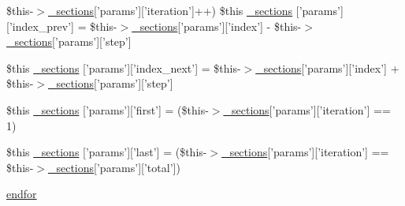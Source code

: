\begin{DoxyCompactItemize}
\$this-\/$>$\hyperlink{_06_06127_05_06_0612781687_05pkgelementindex_8tpl_8php_a9e3d26b39edfe29c3f29b8035ef33828}{\-\_\-sections}\mbox{[}'params'\mbox{]}\mbox{[}'iteration'\mbox{]}++) \*
\$this \hyperlink{default_234d6fa4bfd5eef6424a9ddc74a166350_2_06_06-14_05_06_06-1407541581_05method_8tpl_8php_a34b96969934c8f86c7f8b7c3343f08dc}{\-\_\-sections} \mbox{[}'params'\mbox{]}\mbox{[}'index\-\_\-prev'\mbox{]} = \$this-\/$>$\hyperlink{_06_06127_05_06_0612781687_05pkgelementindex_8tpl_8php_a9e3d26b39edfe29c3f29b8035ef33828}{\-\_\-sections}\mbox{[}'params'\mbox{]}\mbox{[}'index'\mbox{]} -\/ \$this-\/$>$\hyperlink{_06_06127_05_06_0612781687_05pkgelementindex_8tpl_8php_a9e3d26b39edfe29c3f29b8035ef33828}{\-\_\-sections}\mbox{[}'params'\mbox{]}\mbox{[}'step'\mbox{]}
\item 
\$this \hyperlink{default_234d6fa4bfd5eef6424a9ddc74a166350_2_06_06-14_05_06_06-1407541581_05method_8tpl_8php_ae96d763cc26cf8d9dee9bc4d055b1b03}{\-\_\-sections} \mbox{[}'params'\mbox{]}\mbox{[}'index\-\_\-next'\mbox{]} = \$this-\/$>$\hyperlink{_06_06127_05_06_0612781687_05pkgelementindex_8tpl_8php_a9e3d26b39edfe29c3f29b8035ef33828}{\-\_\-sections}\mbox{[}'params'\mbox{]}\mbox{[}'index'\mbox{]} + \$this-\/$>$\hyperlink{_06_06127_05_06_0612781687_05pkgelementindex_8tpl_8php_a9e3d26b39edfe29c3f29b8035ef33828}{\-\_\-sections}\mbox{[}'params'\mbox{]}\mbox{[}'step'\mbox{]}
\item 
\$this \hyperlink{default_234d6fa4bfd5eef6424a9ddc74a166350_2_06_06-14_05_06_06-1407541581_05method_8tpl_8php_a87402c7a624b02674187ef8341a030ef}{\-\_\-sections} \mbox{[}'params'\mbox{]}\mbox{[}'first'\mbox{]} = (\$this-\/$>$\hyperlink{_06_06127_05_06_0612781687_05pkgelementindex_8tpl_8php_a9e3d26b39edfe29c3f29b8035ef33828}{\-\_\-sections}\mbox{[}'params'\mbox{]}\mbox{[}'iteration'\mbox{]} == 1)
\item 
\$this \hyperlink{default_234d6fa4bfd5eef6424a9ddc74a166350_2_06_06-14_05_06_06-1407541581_05method_8tpl_8php_a876ec257e66073afaa19ca5548ecb9a1}{\-\_\-sections} \mbox{[}'params'\mbox{]}\mbox{[}'last'\mbox{]} = (\$this-\/$>$\hyperlink{_06_06127_05_06_0612781687_05pkgelementindex_8tpl_8php_a9e3d26b39edfe29c3f29b8035ef33828}{\-\_\-sections}\mbox{[}'params'\mbox{]}\mbox{[}'iteration'\mbox{]} == \$this-\/$>$\hyperlink{_06_06127_05_06_0612781687_05pkgelementindex_8tpl_8php_a9e3d26b39edfe29c3f29b8035ef33828}{\-\_\-sections}\mbox{[}'params'\mbox{]}\mbox{[}'total'\mbox{]})
\item 
\hyperlink{default_234d6fa4bfd5eef6424a9ddc74a166350_2_06_06-14_05_06_06-1407541581_05method_8tpl_8php_ae8fdc27183f296411bac00ed522ee1ac}{endfor}

\end{DoxyCompactItemize}
